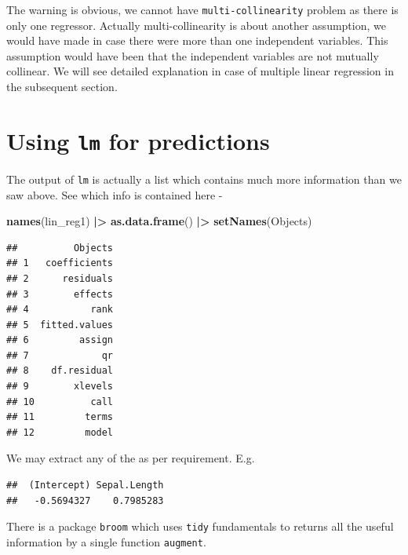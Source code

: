 \documentclass[
]{book}
\newenvironment{Shaded}{\begin{snugshade}}{\end{snugshade}}
\newcommand{\FunctionTok}[1]{\textcolor[rgb]{0.13,0.29,0.53}{\textbf{#1}}}
\newcommand{\NormalTok}[1]{#1}
\newcommand{\SpecialCharTok}[1]{\textcolor[rgb]{0.81,0.36,0.00}{\textbf{#1}}}
\newcommand{\StringTok}[1]{\textcolor[rgb]{0.31,0.60,0.02}{#1}}
\begin{document}
The warning is obvious, we cannot have \texttt{multi-collinearity} problem as there is only one regressor. Actually multi-collinearity is about another assumption, we would have made in case there were more than one independent variables. This assumption would have been that the independent variables are not mutually collinear. We will see detailed explanation in case of multiple linear regression in the subsequent section.

\hypertarget{using-lm-for-predictions}{%
\section{\texorpdfstring{Using \texttt{lm} for predictions}{Using lm for predictions}}\label{using-lm-for-predictions}}

The output of \texttt{lm} is actually a list which contains much more information than we saw above. See which info is contained here -

\begin{Shaded}
\begin{Highlighting}[]
\FunctionTok{names}\NormalTok{(lin\_reg1) }\SpecialCharTok{|\textgreater{}}
  \FunctionTok{as.data.frame}\NormalTok{() }\SpecialCharTok{|\textgreater{}}
  \FunctionTok{setNames}\NormalTok{(}\StringTok{\textquotesingle{}Objects\textquotesingle{}}\NormalTok{)}
\end{Highlighting}
\end{Shaded}

\begin{verbatim}
##          Objects
## 1   coefficients
## 2      residuals
## 3        effects
## 4           rank
## 5  fitted.values
## 6         assign
## 7             qr
## 8    df.residual
## 9        xlevels
## 10          call
## 11         terms
## 12         model
\end{verbatim}

We may extract any of the as per requirement. E.g.

\begin{Shaded}
\end{Shaded}

\begin{verbatim}
##  (Intercept) Sepal.Length 
##   -0.5694327    0.7985283
\end{verbatim}

There is a package \texttt{broom} which uses \texttt{tidy} fundamentals to returns all the useful information by a single function \texttt{augment}.
\end{document}
